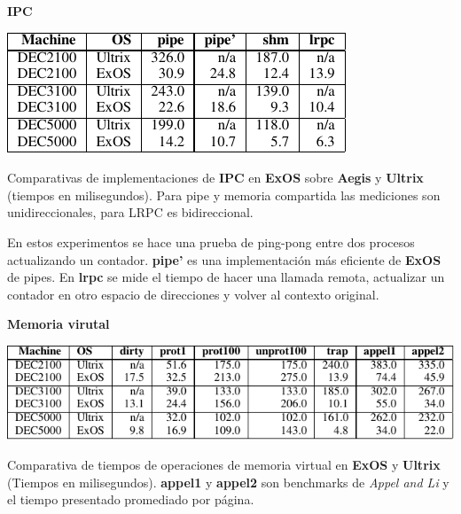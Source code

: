 \documentclass[10pt]{beamer}
\begin{document}
\begin{frame}
\textbf{IPC} \\[2em]
\begin{table}
\includegraphics[scale=0.8]{grafico-ipc.pdf}
\caption{Comparativas de implementaciones de \textbf{IPC} en \textbf{ExOS} sobre \textbf{Aegis} y \textbf{Ultrix} (tiempos en milisegundos). Para pipe y memoria compartida las mediciones son unidireccionales, para LRPC es bidireccional.}
\end{table}
En estos experimentos se hace una prueba de ping-pong entre dos procesos actualizando un contador. \textbf{pipe'} es una implementación más eficiente de \textbf{ExOS} de pipes. En \textbf{lrpc} se mide el tiempo de hacer una llamada remota, actualizar un contador en otro espacio de direcciones y volver al contexto original. 
\end{frame}

\begin{frame}
 \textbf{Memoria virutal} \\[2em]
\begin{table}
\includegraphics[scale=0.8]{grafico-vm.pdf}
\caption{Comparativa de tiempos de operaciones de memoria virtual en \textbf{ExOS} y \textbf{Ultrix} (Tiempos en milisegundos). \textbf{appel1} y \textbf{appel2} son benchmarks de \emph{Appel and Li} y el tiempo presentado promediado por página.}
\end{table}
\end{frame}
\end{document}
